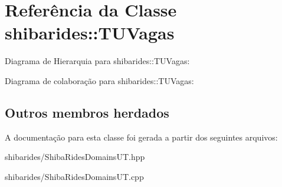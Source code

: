 \hypertarget{classshibarides_1_1TUVagas}{}\section{Referência da Classe shibarides\+:\+:T\+U\+Vagas}
\label{classshibarides_1_1TUVagas}


Diagrama de Hierarquia para shibarides\+:\+:T\+U\+Vagas\+:


Diagrama de colaboração para shibarides\+:\+:T\+U\+Vagas\+:
\subsection*{Outros membros herdados}


A documentação para esta classe foi gerada a partir dos seguintes arquivos\+:\begin{DoxyCompactItemize}
\item 
shibarides/Shiba\+Rides\+Domains\+U\+T.\+hpp\item 
shibarides/Shiba\+Rides\+Domains\+U\+T.\+cpp\end{DoxyCompactItemize}
